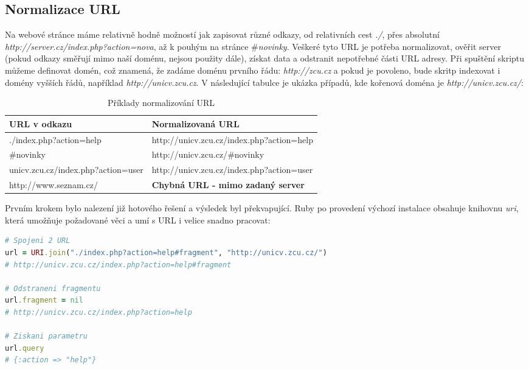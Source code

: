 \documentclass[12pt, a4paper]{report}
\begin{document}
\subsection{Normalizace URL}
Na webové stránce máme relativně hodně možností jak zapisovat různé odkazy, od relativních cest \textit{./}, přes absolutní \textit{http://server.cz/index.php?action=nova}, až k pouhým  na stránce \textit{$\#$novinky}. Veškeré tyto URL je potřeba normalizovat, ověřit server (pokud odkazy směřují mimo naší doménu, nejsou použity dále), získat data a odstranit nepotřebné části URL adresy. Při spuštění skriptu můžeme definovat  domén, což znamená, že zadáme doménu prvního řádu: \textit{http://zcu.cz} a pokud je povoleno, bude skritp indexovat i domény vyšších řádů, například \textit{http://unicv.zcu.cz}. V následující tabulce je ukázka případů, kde kořenová doména je \textit{http://unicv.zcu.cz/}:

\begin{table}
\centering
\begin{tabular}{|l|l|}
\hline
\bf URL v odkazu & \bf Normalizovaná URL \\
\hline
\hline
./index.php?action=help &  http://unicv.zcu.cz/index.php?action=help \\
\hline
$\#$novinky & http://unicv.zcu.cz/$\#$novinky \\
\hline
unicv.zcu.cz/index.php?action=user & http://unicv.zcu.cz/index.php?action=user \\
\hline
http://www.seznam.cz/ & \bf Chybná URL - mimo zadaný server \\
\hline
\end{tabular}
\label{tab:url}
\caption{Příklady normalizování URL}
\end{table}
\newpage
Prvním krokem bylo nalezení již hotového řešení a výsledek byl překvapující. Ruby po provedení výchozí instalace obsahuje knihovnu \textit{uri}, která umožňuje požadované věci a umí s URL i velice snadno pracovat:

\begin{lstlisting}[label=equals_classes,language=Ruby, caption=Normalizování URL pomocí třídy URI]
# Spojeni 2 URL
url = URI.join("./index.php?action=help#fragment", "http://unicv.zcu.cz/") 
# http://unicv.zcu.cz/index.php?action=help#fragment

# Odstraneni fragmentu
url.fragment = nil
# http://unicv.zcu.cz/index.php?action=help

# Ziskani parametru
url.query
# {:action => "help"}
\end{lstlisting}
\end{document}

